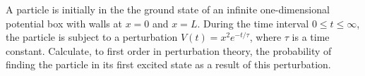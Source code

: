 \newcommand{\Vt}{V(t)}
\newcommand{\psiE}{\psi_E}
\newcommand{\qp}{^{(1)}}
\newcommand{\cnq}{c_n\qp}
\newcommand{\cnqt}{\cnq(t)}
\newcommand{\too}{t_0}
\newcommand{\inttot}{\int_{\too}^t}
\newcommand{\omg}{\omega}
\newcommand{\omgni}{\omg_{n i}}
\newcommand{\dtp}{\dd{t'}}
\newcommand{\Ho}{H_0}
\newcommand{\psiq}{\psi_1}
\newcommand{\psiw}{\psi_2}
\newcommand{\psiqt}{\psiq(t)}
\newcommand{\psiwt}{\psiw(t)}
\newcommand{\Eq}{E_1}
\newcommand{\Ew}{E_2}
\newcommand{\dxp}{\dd{x'}}
\newcommand{\dxpp}{\dd{x''}}
\newcommand{\intoi}{\int_0^\infty}
\newcommand{\intoL}{\int_0^L}
\newcommand{\intopi}{\int_0^\pi}
\newcommand{\intoepi}{\int_0^{3\pi}}
\newcommand{\du}{\dd{u}}
\newcommand{\ddv}{\dd{v}}
\newcommand{\intot}{\int_0^t}


\begin{statement}{}
	A particle is initially in the the ground state of an infinite one-dimensional potential box with walls at $x = 0$ and $x = L$.  During the time interval $0 \leq t \leq \infty$, the particle is subject to a perturbation $\Vt = x^2 e^{-t/\tau}$, where $\tau$ is a time constant.  Calculate, to first order in perturbation theory, the probability of finding the particle in its first excited state as a result of this perturbation.
\end{statement}


